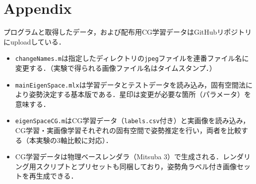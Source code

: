 \documentclass{article}
\begin{document}
\section*{Appendix}
プログラムと取得したデータ，および配布用CG学習データはGitHubリポジトリにuploadしている．
\begin{itemize}
    \item \texttt{changeNames.m}は指定したディレクトリの\texttt{jpeg}ファイルを連番ファイル名に変更する．（実験で得られる画像ファイル名はタイムスタンプ．）
    \item \texttt{mainEigenSpace.mlx}は学習データとテストデータを読み込み，固有空間法により姿勢決定する基本版である．星印は変更が必要な箇所（パラメータ）を意味する．
    \item \texttt{eigenSpaceCG.m}はCG学習データ（\texttt{labels.csv}付き）と実画像を読み込み，CG学習・実画像学習それぞれの固有空間で姿勢推定を行い，両者を比較する（本実験の3軸比較に対応）．
    \item CG学習データは物理ベースレンダラ（Mitsuba 3）で生成される．レンダリング用スクリプトとプリセットも同梱しており，姿勢角ラベル付き画像セットを再生成できる．
\end{itemize}






\end{document}
